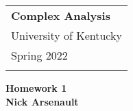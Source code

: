 \documentclass[a4paper,12pt]{article} %
\theoremstyle{plain}
\theoremstyle{definition}
\begin{document}
\thispagestyle{empty} %
\begin{tabular}{p{15.5cm}} %
{\large \bf Complex Analysis} \\
University of Kentucky \\ Spring 2022 \\
\hline %
\\
\end{tabular} %

\vspace*{0.3cm} %

\begin{center} %
  {\Large \bf Homework 1} %
	\vspace{2mm} \\
  \textbf{Nick Arsenault}
\end{center}  
\vspace{0.4cm}
\end{document}
